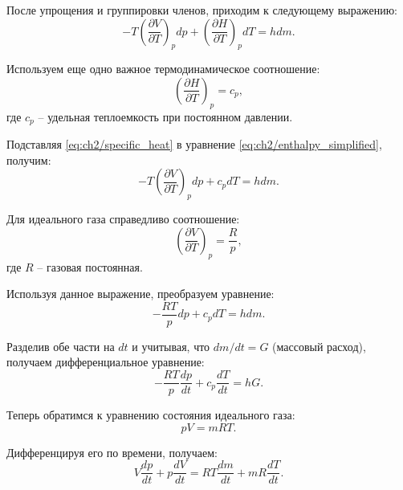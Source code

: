 После упрощения и группировки членов, приходим к следующему выражению:
\begin{equation}\label{eq:ch2/enthalpy_simplified}
    -T \left(
    \frac{\partial V}{\partial T}
    \right)_p dp + \left(
    \frac{\partial H}{\partial T}
    \right)_p dT = hdm.
\end{equation}

Используем еще одно важное термодинамическое соотношение:
\begin{equation}\label{eq:ch2/specific_heat}
    \left(
    \frac{\partial H}{\partial T}
    \right)_p = c_p,
\end{equation}
где $c_p$ -- удельная теплоемкость при постоянном давлении.

Подставляя \eqref{eq:ch2/specific_heat} в уравнение \eqref{eq:ch2/enthalpy_simplified}, получим:
\begin{equation}\label{eq:ch2/enthalpy_final}
    -T \left(
    \frac{\partial V}{\partial T}
    \right)_p dp + c_p dT = hdm.
\end{equation}

Для идеального газа справедливо соотношение:
\begin{equation}\label{eq:ch2/ideal_gas_relation}
    \left(\frac{\partial V}{\partial T}\right)_p = \frac{R}{p},
\end{equation}
где $R$ -- газовая постоянная.

Используя данное выражение, преобразуем уравнение:
\begin{equation}\label{eq:ch2/pressure_temp_relation}
    -\frac{RT}{p} dp + c_p dT = h dm.
\end{equation}

Разделив обе части на $dt$ и учитывая, что $dm/dt = G$ (массовый расход), получаем дифференциальное уравнение:
\begin{equation}\label{eq:ch2/differential_equation}
    -\frac{RT}{p} \frac{dp}{dt} + c_p \frac{dT}{dt} = hG.
\end{equation}

Теперь обратимся к уравнению состояния идеального газа:
\begin{equation}\label{eq:ch2/ideal_gas_equation}
    pV = mRT.
\end{equation}

Дифференцируя его по времени, получаем:
\begin{equation}\label{eq:ch2/ideal_gas_differential}
    V\frac{dp}{dt} + p\frac{dV}{dt} = RT\frac{dm}{dt} + mR\frac{dT}{dt}.
\end{equation}

